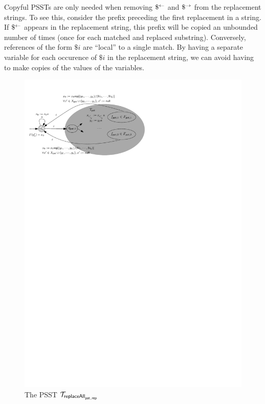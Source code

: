 Copyful PSSTs are only needed when removing $\$^{\leftarrow}$ and $\$^{\rightarrow}$ from the replacement strings.
To see this, consider the prefix preceding the first replacement in a string.
If $\$^{\leftarrow}$ appears in the replacement string, this prefix will be copied an unbounded number of times (once for each matched and replaced substring).
Conversely, references of the form $\$i$ are ``local'' to a single match.
By having a separate variable for each occurence of $\$i$ in the replacement string, we can avoid having to make copies of the values of the variables.

\begin{figure}[ht]
	\vspace{-2mm}
    \centering
    \includegraphics[scale=0.7]{psst-replaceall.pdf}
    \caption{The PSST $\mathcal{T}_{\mathsf{replaceAll}_{\mathsf{pat},\mathsf{rep}}}$}
    \label{fig-psst-replaceall}
    \vspace{-2mm}
\end{figure}


